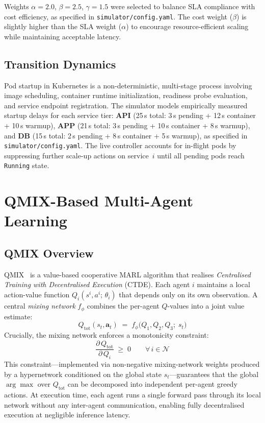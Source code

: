 \documentclass[conference]{IEEEtran}
\begin{document}
Weights $\alpha = 2.0$, $\beta = 2.5$, $\gamma = 1.5$ were selected
to balance SLA compliance with cost efficiency, as specified in
\texttt{simulator/config.yaml}. The cost weight ($\beta$) is slightly
higher than the SLA weight ($\alpha$) to encourage resource-efficient
scaling while maintaining acceptable latency.

\subsection{Transition Dynamics}

Pod startup in Kubernetes is a non-deterministic, multi-stage
process involving image scheduling, container runtime initialization,
readiness probe evaluation, and service endpoint registration.
The simulator models empirically measured startup delays for each
service tier: \textbf{API} (25\,s total: 3\,s pending + 12\,s
container + 10\,s warmup), \textbf{APP} (21\,s total: 3\,s pending +
10\,s container + 8\,s warmup), and \textbf{DB} (15\,s total: 2\,s
pending + 8\,s container + 5\,s warmup), as specified in
\texttt{simulator/config.yaml}. The live controller accounts for
in-flight pods by suppressing
further scale-up actions on service~$i$ until all pending pods
reach \texttt{Running} state.

\section{QMIX-Based Multi-Agent Learning}
\label{sec:qmix}

\subsection{QMIX Overview}

QMIX~\cite{Rashid2018} is a value-based cooperative MARL algorithm
that realises \emph{Centralised Training with Decentralised
Execution} (CTDE). Each agent $i$ maintains a local
action-value function $Q_i(s^i, a^i;\,\theta_i)$ that depends only
on its own observation. A central \emph{mixing network}
$f_\phi$ combines the per-agent $Q$-values into a joint value
estimate:
\begin{equation}
  Q_{\mathrm{tot}}(s_t, \mathbf{a}_t) \;=\;
  f_\phi\bigl(Q_1, Q_2, Q_3;\; s_t\bigr)
  \label{eq:qtot}
\end{equation}
Crucially, the mixing network enforces a monotonicity constraint:
\begin{equation}
  \frac{\partial\, Q_{\mathrm{tot}}}{\partial\, Q_i} \;\geq\; 0
  \qquad \forall\, i \in \mathcal{N}
  \label{eq:mono}
\end{equation}
This constraint---implemented via non-negative mixing-network
weights produced by a hypernetwork conditioned on the global
state $s_t$---guarantees that the global $\arg\max$ over
$Q_{\mathrm{tot}}$ can be decomposed into independent per-agent
greedy actions. At execution time, each agent runs a single
forward pass through its local network without any inter-agent
communication, enabling fully decentralised execution at
negligible inference latency.
\end{document}
